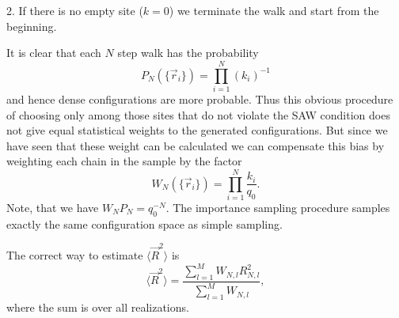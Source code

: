 2. If there is no empty site ($k=0$) we terminate the walk and 
start from the beginning.

It is clear that each $N$ step walk has the probability
\begin{equation*}
P_N(\{ \vec{r}_i \}) = \prod_{i=1}^N (k_i)^{-1}
\end{equation*}
and hence dense configurations are more probable. Thus this 
obvious procedure of choosing only among those  sites that do not 
violate the SAW condition does not give equal statistical weights
to the generated configurations. But since we have seen that these 
weight can be calculated we can compensate this bias by weighting 
each chain in the sample by the factor
\begin{equation*}
W_N(\{ \vec{r}_i \}) =  \prod_{i=1}^N \frac{k_i}{q_0}.
\end{equation*}
Note, that we have $W_N P_N = q_0^{-N}$. The importance 
sampling procedure samples 
exactly the same configuration space as simple sampling.

The correct way to estimate $\langle \vec{R}^2 \rangle$ is
\begin{equation*}
\langle \vec{R}^2 \rangle = \frac{\sum_{l=1}^M W_{N,l} R^2_{N,l}}
                               {\sum_{l=1}^M W_{N,l}},
\end{equation*}
where the sum is over all realizations.

